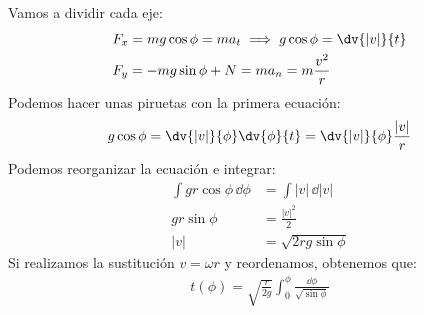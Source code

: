 \documentclass{article}
\begin{document}
\begin{center}
\end{center}
Vamos a dividir cada eje:
\begin{equation}
    \begin{split}
        &F_{x}=mg\cos \phi =ma_{t} \implies g\cos \phi = \dv{|v|}{t}\\
        &F_{y}=-mg\sin \phi +N=ma_{n}=m \frac{v^{2}}{r}
    \end{split}
\end{equation}
Podemos hacer unas piruetas con la primera ecuación:
\begin{equation}
    \begin{split}
        g\cos \phi = \dv{|v|}{\phi }\dv{\phi }{t}=\dv{|v|}{\phi } \frac{|v|}{r}
    \end{split}
\end{equation}
Podemos reorganizar la ecuación e integrar:
\begin{equation}
    \begin{split}
        \int gr\cos \phi \, \dd{\phi } &= \int |v|\,\dd{|v|}\\
        gr\sin \phi &= \frac{|v|^{2}}{2}\\
        |v|&=\sqrt{2rg\sin \phi }
    \end{split}
\end{equation}
Si realizamos la sustitución $v=\omega r$ y reordenamos, obtenemos que:
\begin{equation}
    \begin{split}
        t(\phi )= \sqrt{\frac{r}{2g}} \int_{0}^\phi \frac{\dd{\phi }}{\sqrt{\sin \phi }} 
    \end{split}
\end{equation}
\end{document}
